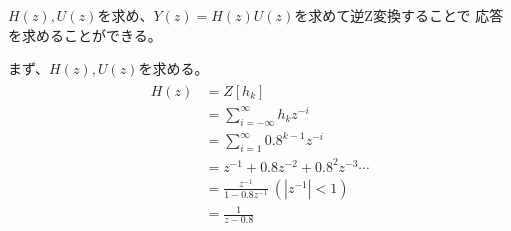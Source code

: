\documentclass[a4paper,11pt]{ltjsarticle}
\begin{document}
$H(z),U(z)$を求め、$Y(z)=H(z)U(z)$を求めて逆Z変換することで
応答を求めることができる。

まず、$H(z),U(z)$を求める。\\
\begin{gather*}
  \begin{split}
    H(z) 
    &= Z[h_{k}] \\
    &= \sum_{i = -\infty}^{\infty}h_{k}z^{-i} \\
    &= \sum_{i = 1}^{\infty}0.8^{k-1}z^{-i} \\
    &= z^{-1} + 0.8z^{-2} + 0.8^{2}z^{-3} \dotsb \\
    &= \frac{z^{-1}}{1 - 0.8z^{-1}} \ (|z^{-1}| < 1) \\
    &= \frac{1}{z-0.8}
  \end{split}
\end{gather*}
\end{document}
